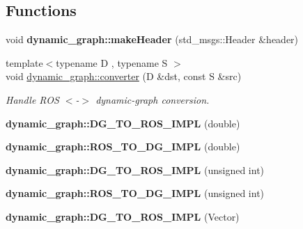 \subsection*{Functions}
\begin{DoxyCompactItemize}
\item 
\mbox{\label{namespacedynamic__graph_a7932709c47f2977a4478bd6f035ee12b}} 
void {\bfseries dynamic\+\_\+graph\+::make\+Header} (std\+\_\+msgs\+::\+Header \&header)
\item 
{\footnotesize template$<$typename D , typename S $>$ }\\void \hyperlink{namespacedynamic__graph_aa00932c9efb8a607efd6997386d78680}{dynamic\+\_\+graph\+::converter} (D \&dst, const S \&src)
\begin{DoxyCompactList}\small\item\em Handle R\+OS $<$-\/$>$ dynamic-\/graph conversion. \end{DoxyCompactList}\item 
\mbox{\label{namespacedynamic__graph_a22ff0d85472d1b606719f789a73224c3}} 
{\bfseries dynamic\+\_\+graph\+::\+D\+G\+\_\+\+T\+O\+\_\+\+R\+O\+S\+\_\+\+I\+M\+PL} (double)
\item 
\mbox{\label{namespacedynamic__graph_a8487bee8650edee2dabb3c21662f411f}} 
{\bfseries dynamic\+\_\+graph\+::\+R\+O\+S\+\_\+\+T\+O\+\_\+\+D\+G\+\_\+\+I\+M\+PL} (double)
\item 
\mbox{\label{namespacedynamic__graph_a894a6396a849e5a251f807e42f160c28}} 
{\bfseries dynamic\+\_\+graph\+::\+D\+G\+\_\+\+T\+O\+\_\+\+R\+O\+S\+\_\+\+I\+M\+PL} (unsigned int)
\item 
\mbox{\label{namespacedynamic__graph_afd65ab6689e1cc46f28c0c6e365f0ff6}} 
{\bfseries dynamic\+\_\+graph\+::\+R\+O\+S\+\_\+\+T\+O\+\_\+\+D\+G\+\_\+\+I\+M\+PL} (unsigned int)
\item 
\mbox{\label{namespacedynamic__graph_ac2a5616ba0bc2168c574b16fb4512b1c}} 
{\bfseries dynamic\+\_\+graph\+::\+D\+G\+\_\+\+T\+O\+\_\+\+R\+O\+S\+\_\+\+I\+M\+PL} (Vector)
\item 
\mbox{\label{namespacedynamic__graph_a3b3e6a25a7275cd7636166190a574df2}} 

\end{DoxyCompactItemize}
